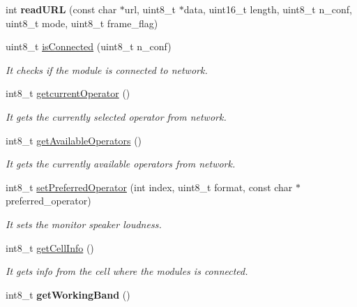 \begin{DoxyCompactItemize}
\item 
int {\bfseries read\+U\+RL} (const char $\ast$url, uint8\+\_\+t $\ast$data, uint16\+\_\+t length, uint8\+\_\+t n\+\_\+conf, uint8\+\_\+t mode, uint8\+\_\+t frame\+\_\+flag)\hypertarget{class_wasp_g_p_r_s___pro__core_af686de318ff54f51e56b5898dcb9c42a}{}\label{class_wasp_g_p_r_s___pro__core_af686de318ff54f51e56b5898dcb9c42a}

\item 
uint8\+\_\+t \hyperlink{class_wasp_g_p_r_s___pro__core_a425a3fba14da02a5d2748a4893a2fd18}{is\+Connected} (uint8\+\_\+t n\+\_\+conf)
\begin{DoxyCompactList}\small\item\em It checks if the module is connected to network. \end{DoxyCompactList}\item 
int8\+\_\+t \hyperlink{class_wasp_g_p_r_s___pro__core_af9cf9dcf3c7e0e830e040d6cbe2865be}{getcurrent\+Operator} ()
\begin{DoxyCompactList}\small\item\em It gets the currently selected operator from network. \end{DoxyCompactList}\item 
int8\+\_\+t \hyperlink{class_wasp_g_p_r_s___pro__core_a5c57fcdcf5758b2fc1b85fa8515eb1c1}{get\+Available\+Operators} ()
\begin{DoxyCompactList}\small\item\em It gets the currently available operators from network. \end{DoxyCompactList}\item 
int8\+\_\+t \hyperlink{class_wasp_g_p_r_s___pro__core_aebd5532a001d860a236724047c4f9bfc}{set\+Preferred\+Operator} (int index, uint8\+\_\+t format, const char $\ast$preferred\+\_\+operator)
\begin{DoxyCompactList}\small\item\em It sets the monitor speaker loudness. \end{DoxyCompactList}\item 
int8\+\_\+t \hyperlink{class_wasp_g_p_r_s___pro__core_ad92cd6dcee7089e4dba5d9dd821e7d67}{get\+Cell\+Info} ()
\begin{DoxyCompactList}\small\item\em It gets info from the cell where the modules is connected. \end{DoxyCompactList}\item 
int8\+\_\+t {\bfseries get\+Working\+Band} ()\hypertarget{class_wasp_g_p_r_s___pro__core_a772e5969dec7c7c7f0572606aa006043}{}\label{class_wasp_g_p_r_s___pro__core_a772e5969dec7c7c7f0572606aa006043}


\end{DoxyCompactItemize}
